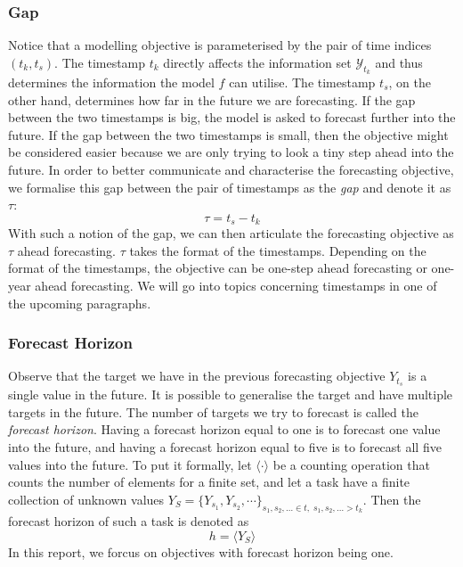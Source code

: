 \subsubsection{Gap}
Notice that a modelling objective is parameterised by the pair of time indices $(t_k, t_s)$. The timestamp $t_k$ directly affects the information set $\mathcal{Y}_{t_k}$ and thus determines the information the model $f$ can utilise. The timestamp $t_s$, on the other hand, determines how far in the future we are forecasting. If the gap between the two timestamps is big, the model is asked to forecast further into the future. If the gap between the two timestamps is small, then the objective might be considered easier because we are only trying to look a tiny step ahead into the future. In order to better communicate and characterise the forecasting objective, we formalise this gap between the pair of timestamps as the \textit{gap} and denote it as $\tau$:
\begin{equation*}
    \tau = t_s - t_k
\end{equation*}
With such a notion of the gap, we can then articulate the forecasting objective as $\tau$ ahead forecasting. $\tau$ takes the format of the timestamps. Depending on the format of the timestamps, the objective can be one-step ahead forecasting or one-year ahead forecasting. We will go into topics concerning timestamps in one of the upcoming paragraphs.

\subsubsection{Forecast Horizon}
Observe that the target we have in the previous forecasting objective $Y_{t_s}$ is a single value in the future. It is possible to generalise the target and have multiple targets in the future. The number of targets we try to forecast is called the \textit{forecast horizon}. Having a forecast horizon equal to one is to forecast one value into the future, and having a forecast horizon equal to five is to forecast all five values into the future. To put it formally, let $\langle \cdot \rangle$ be a counting operation that counts the number of elements for a finite set, and let a task have a finite collection of unknown values $Y_S = \{ Y_{s_1}, Y_{s_2}, \cdots \}_{s_1, s_2, \ldots \in t, \; s_1, s_2, \ldots > t_k}$. Then the forecast horizon of such a task is denoted as
\begin{equation*}
    h = \langle Y_S \rangle
\end{equation*}
In this report, we forcus on objectives with forecast horizon being one.

